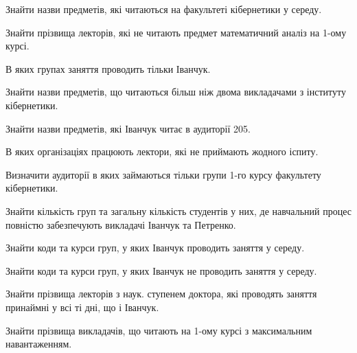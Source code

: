 \begin{card}
    \item Знайти назви предметів, які читаються на факультеті кібернетики у середу.
    \item Знайти прізвища лекторів, які не читають предмет математичний аналіз на 1-ому курсі.
    \item В яких групах заняття проводить тільки Іванчук.
    \item Знайти назви предметів, що читаються більш ніж двома викладачами з інституту кібернетики.
\end{card}

\begin{card}
    \item Знайти назви предметів, які Іванчук читає в аудиторії 205.
    \item В яких організаціях працюють лектори, які не приймають жодного іспиту.
    \item Визначити аудиторії в яких займаються тільки групи 1-го курсу факультету кібернетики.
    \item Знайти кількість груп та загальну кількість студентів у них, де навчальний процес повністю забезпечують викладачі Іванчук та Петренко.
\end{card}

\begin{card}
    \item Знайти коди та курси груп, у яких Іванчук проводить заняття у середу.
    \item Знайти коди та курси груп, у яких Іванчук не проводить заняття у середу.
    \item Знайти прізвища лекторів з наук. ступенем доктора, які проводять заняття принаймні у всі ті дні, що і Іванчук.
    \item Знайти прізвища викладачів, що читають на 1-ому курсі з максимальним навантаженням.
\end{card}
